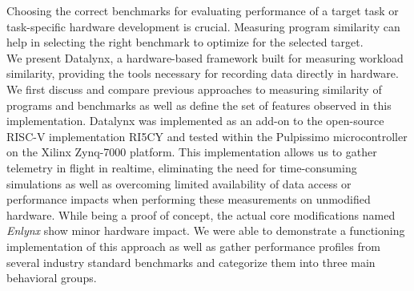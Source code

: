 Choosing the correct benchmarks for evaluating performance of a target task or task-specific hardware development is crucial. Measuring program similarity can help in selecting the right benchmark to optimize for the selected target. \\
We present Datalynx, a hardware-based framework built for measuring workload similarity, providing the tools necessary for recording data directly in hardware. We first discuss and compare previous approaches to measuring similarity of programs and benchmarks as well as define the set of features observed in this implementation. Datalynx was implemented as an add-on to the open-source RISC-V implementation RI5CY and tested within the Pulpissimo microcontroller on the Xilinx Zynq-7000 platform. This implementation allows us to gather telemetry in flight in realtime, eliminating the need for time-consuming simulations as well as overcoming limited availability of data access or performance impacts when performing these measurements on unmodified hardware. While being a proof of concept, the actual core modifications named \emph{Enlynx} show minor hardware impact. We were able to demonstrate a functioning implementation of this approach as well as gather performance profiles from several industry standard benchmarks and categorize them into three main behavioral groups.